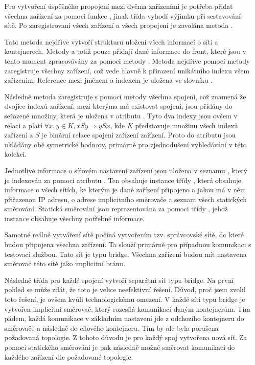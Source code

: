 Pro vytvoření úspěšného propojení mezi dvěma zařízeními je potřeba přidat všechna zařízení za pomoci funkce , jinak třída vyhodí výjimku při sestavování sítě. Po zaregistrovaní všech zařízení a všech propojení je zavolána metoda . 

Tato metoda nejdříve vytvoří strukturu uložení všech informací o síti a kontejnerech. Metody  a  totiž pouze přidají dané informace do front, které jsou v tento moment zpracovávány za pomoci metody . Metoda nejdříve pomocí metody  zaregistruje všechny zařízení, což vede hlavně k přirazení unikátního indexu všem zařízením. Reference mezi jménem a indexem je uložena ve slovníku . 

Následně metoda zaregistruje s pomocí metody  všechna spojení, což znamená že dvojice indexů zařízení, mezi kterýma má existovat spojení, jsou přidány do seřazené množiny, která je uložena v atributu . Tyto dva indexy jsou ovšem v relaci a platí $\forall x,y \in K, xSy \Rightarrow ySx$, kde $K$ představuje množinu všech indexů zařízení a $S$ je binární relace spojení zařízení zařízení.
Proto do atributu  jsou ukládány obě symetrické hodnoty, primárně pro zjednodušení vyhledávání v této kolekci.

Jednotlivé informace o síťovém nastavení zařízení jsou uložena v seznamu , který je indexován za pomoci atributu . Ten obsahuje instance třídy , která obsahuje informace o všech sítích, ke kterým je dané zařízení připojeno a jakou má v něm přiřazenou IP adresu, o adrese implicitního směrovače a seznam všech statických směrování. Statická směrování jsou reprezentována za pomoci třídy , jehož instance obsahuje všechny potřebné informace. 

Samotné reálné vytváření sítě počíná vytvořením tzv. správcovské sítě, do které budou připojena všechna zařízení. Ta slouží primárně pro případnou komunikaci s testovací službou. Tato síť je typu bridge. Všechna zařízení budou mít nastavena směrovač této sítě jako implicitní bránu.

Následně třída pro každé spojení vytvoří separátní síť typu bridge. Na první pohled se může zdát, že toto je velice neefektivní řešení. Důvod, proč jsem zvolil toto řešení, je ovšem kvůli technologickému omezení. V každé síti typu bridge je vytvořen implicitní směrovač, který rozesílá komunikaci daným kontejnerům. Tím pádem, každá komunikace v základním nastavení jde z odchozího kontejneru do směrovače a následně do cílového kontejneru. Tím by ale byla porušena požadovaná topologie. Z tohoto důvodu je pro každý spoj vytvořena nová síť. Za pomoci statického směrování je pak následně možné směrovat komunikaci do každého zařízení dle požadované topologie. 

